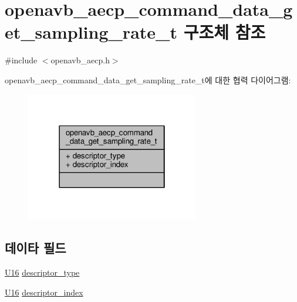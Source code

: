 \hypertarget{structopenavb__aecp__command__data__get__sampling__rate__t}{}\section{openavb\+\_\+aecp\+\_\+command\+\_\+data\+\_\+get\+\_\+sampling\+\_\+rate\+\_\+t 구조체 참조}
\label{structopenavb__aecp__command__data__get__sampling__rate__t}


{\ttfamily \#include $<$openavb\+\_\+aecp.\+h$>$}



openavb\+\_\+aecp\+\_\+command\+\_\+data\+\_\+get\+\_\+sampling\+\_\+rate\+\_\+t에 대한 협력 다이어그램\+:
\nopagebreak
\begin{figure}[H]
\begin{center}
\leavevmode
\includegraphics[width=214pt]{structopenavb__aecp__command__data__get__sampling__rate__t__coll__graph}
\end{center}
\end{figure}
\subsection*{데이타 필드}
\begin{DoxyCompactItemize}
\item 
\hyperlink{openavb__types__base__pub_8h_a0a0a322d5fa4a546d293a77ba8b4a71f}{U16} \hyperlink{structopenavb__aecp__command__data__get__sampling__rate__t_a1e231d7874aada5925b29affc76782cc}{descriptor\+\_\+type}
\item 
\hyperlink{openavb__types__base__pub_8h_a0a0a322d5fa4a546d293a77ba8b4a71f}{U16} \hyperlink{structopenavb__aecp__command__data__get__sampling__rate__t_ab26fb363c24b9a2a4391f9171c981b08}{descriptor\+\_\+index}
\end{DoxyCompactItemize}


